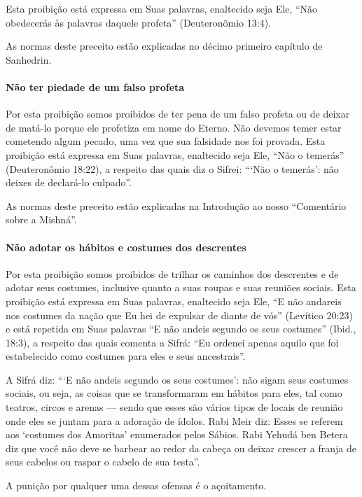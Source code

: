 Esta proibição está expressa em Suas palavras, enaltecido seja Ele,
``Não obedecerás às palavras daquele profeta'' (Deuteronômio 13:4).

As normas deste preceito estão explicadas no décimo primeiro capítulo
de Sanhedrin.

\paragraph{Não ter piedade de um falso profeta}

Por esta proibição somos proibidos de ter pena de um falso profeta ou de
deixar de matá-lo porque ele profetiza em nome do Eterno. Não devemos
temer estar cometendo algum pecado, uma vez que sua falsidade nos foi
provada. Esta proibição está expressa em Suas palavras, enaltecido seja
Ele, ``Não o temerás'' (Deuteronômio 18:22), a respeito das quais diz o
Sifrei: ```Não o temerás': não deixes de declará-lo culpado''.

As normas deste preceito estão explicadas na Introdução ao nosso
``Comentário sobre a Mishná''.

\paragraph{Não adotar os hábitos e costumes dos descrentes}

Por esta proibição somos proibidos de trilhar os caminhos dos descrentes
e de adotar seus costumes, inclusive quanto a suas roupas e suas
reuniões sociais. Esta proibição está expressa em Suas palavras,
enaltecido seja Ele, ``E não andareis nos costumes da nação que Eu hei
de expulsar de diante de vós'' (Levítico 20:23) e está repetida em Suas
palavras ``E não andeis segundo os seus costumes'' (Ibid., 18:3), a
respeito das quais comenta a Sifrá: ``Eu ordenei apenas aquilo que foi
estabelecido como costumes para eles e seus ancestrais''.

A Sifrá diz: ```E não andeis segundo os seus costumes': não sigam seus
costumes sociais, ou seja, as coisas que se transformaram em hábitos
para eles, tal como teatros, circos e arenas --- sendo que esses são
vários tipos de locais de reunião onde eles se juntam para a adoração de
ídolos. Rabi Meir diz: Esses se referem aos `costumes dos Amoritas'
enumerados pelos Sábios. Rabi Yehudá ben Betera diz que você não deve se
barbear ao redor da cabeça ou deixar crescer a franja de seus cabelos ou
raspar o cabelo de sua testa''.

A punição por qualquer uma dessas ofensas é o açoitamento.

